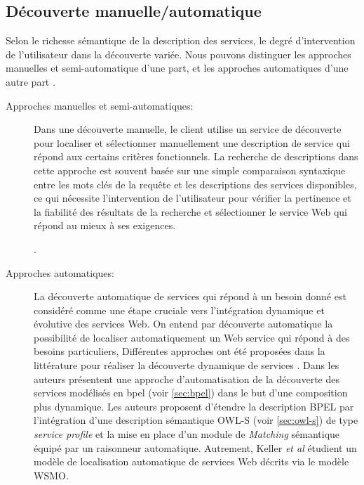   \subsection{Découverte manuelle/automatique}
  \label{sec:ws-desc:manual-vs-auto}
  Selon le richesse sémantique de la description des services, le
  degré d'intervention de l'utilisateur dans la découverte
  variée. Nous pouvons distinguer les approches manuelles et
  semi-automatique d'une part, et les approches automatiques d'une
  autre part \cite{elie2010,garofalakis2004web}.

  \renewcommand{\descriptionlabel}[1]{\hspace{0.1cm}\textbullet~\textsf{#1}}
  \begin{description}
  \item[Approches manuelles et semi-automatiques:] Dans une découverte
    manuelle, le client utilise un service de découverte pour
    localiser et sélectionner manuellement une description de service
    qui répond aux certains critères fonctionnels. La recherche de
    descriptions dans cette approche est souvent basée sur une simple
    comparaison syntaxique entre les mots clés de la requête et les
    descriptions des services disponibles, ce qui nécessite
    l'intervention de l'utilisateur pour vérifier la pertinence et la
    fiabilité des résultats de la recherche et sélectionner le service
    Web qui répond au mieux à ses exigences.

    .

  \item[Approches automatiques:] La découverte automatique de services
    qui répond à un besoin donné est considéré comme une étape
    cruciale vers l'intégration dynamique et évolutive des services
    Web. On entend par découverte automatique la possibilité de
    localiser automatiquement un Web service qui répond à des besoins
    particuliers, Différentes approches ont été proposées dans la
    littérature pour réaliser la découverte dynamique de services
    \cite{paolucci2002semantic, bernstein2002discovering,
      mandell2003bottom,
      benatallah2005automating,keller2005automatic}. Dans
    \cite{mandell2003bottom} les auteurs présentent une approche
    d'automatisation de la découverte des services modélisés en
    \acrshort{bpel} (voir \ref{sec:bpel}) dans le but d'une
    composition plus dynamique. Les auteurs proposent d'étendre la
    description \textsc{BPEL} par l'intégration d'une description
    sémantique \textsc{OWL-S} (voir \ref{sec:owl-s}) de type
    \textit{service profile} et la mise en place d'un module de
    \textit{Matching} sémantique équipé par un raisonneur
    automatique. Autrement, Keller \textit{et al}
    \cite{keller2005automatic} étudient un modèle de localisation
    automatique de services Web décrits via le modèle \textsc{WSMO}.
  \end{description}


